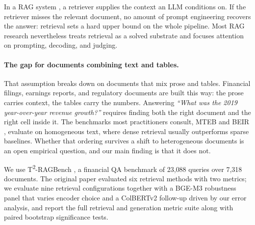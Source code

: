 \documentclass{article}
\begin{document}
In a RAG system \citep{lewis2020rag}, a retriever supplies the context an LLM conditions on. If the retriever misses the relevant document, no amount of prompt engineering recovers the answer: retrieval sets a hard upper bound on the whole pipeline. Most RAG research nevertheless treats retrieval as a solved substrate and focuses attention on prompting, decoding, and judging.

\paragraph{The gap for documents combining text and tables.}
That assumption breaks down on documents that mix prose and tables. Financial filings, earnings reports, and regulatory documents are built this way: the prose carries context, the tables carry the numbers. Answering \emph{``What was the 2019 year-over-year revenue growth?''} requires finding both the right document and the right cell inside it. The benchmarks most practitioners consult, MTEB \citep{muennighoff2023mteb} and BEIR \citep{thakur2021beir}, evaluate on homogeneous text, where dense retrieval usually outperforms sparse baselines. Whether that ordering survives a shift to heterogeneous documents is an open empirical question, and our main finding is that it does not.

We use T\textsuperscript{2}-RAGBench \citep{strich2026t2ragbench}, a financial QA benchmark of 23{,}088 queries over 7{,}318 documents. The original paper evaluated six retrieval methods with two metrics; we evaluate nine retrieval configurations together with a BGE-M3 robustness panel that varies encoder choice and a ColBERTv2 follow-up driven by our error analysis, and report the full retrieval and generation metric suite along with paired bootstrap significance tests.
\end{document}
